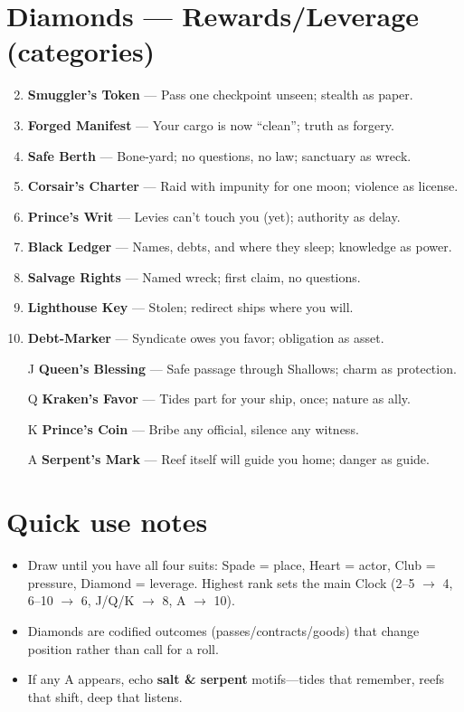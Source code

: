 \section*{Diamonds --- Rewards/Leverage (categories)}
\label{sec:zakov-rewards}
\begin{enumerate}
\setcounter{enumi}{1}
\item \textbf{Smuggler's Token} --- Pass one checkpoint unseen; stealth as paper.
\item \textbf{Forged Manifest} --- Your cargo is now ``clean''; truth as forgery.
\item \textbf{Safe Berth} --- Bone-yard; no questions, no law; sanctuary as wreck.
\item \textbf{Corsair's Charter} --- Raid with impunity for one moon; violence as license.
\item \textbf{Prince's Writ} --- Levies can't touch you (yet); authority as delay.
\item \textbf{Black Ledger} --- Names, debts, and where they sleep; knowledge as power.
\item \textbf{Salvage Rights} --- Named wreck; first claim, no questions.
\item \textbf{Lighthouse Key} --- Stolen; redirect ships where you will.
\item \textbf{Debt-Marker} --- Syndicate owes you favor; obligation as asset.
\item[J] \textbf{Queen's Blessing} --- Safe passage through Shallows; charm as protection.
\item[Q] \textbf{Kraken's Favor} --- Tides part for your ship, once; nature as ally.
\item[K] \textbf{Prince's Coin} --- Bribe any official, silence any witness.
\item[A] \textbf{Serpent's Mark} --- Reef itself will guide you home; danger as guide.
\end{enumerate}

\section*{Quick use notes}
\label{sec:zakov-quick-use}
\begin{itemize}
\item Draw until you have all four suits: Spade = place, Heart = actor, Club = pressure, Diamond = leverage. Highest rank sets the main Clock (2--5 $\rightarrow$ 4, 6--10 $\rightarrow$ 6, J/Q/K $\rightarrow$ 8, A $\rightarrow$ 10).
\item Diamonds are codified outcomes (passes/contracts/goods) that change position rather than call for a roll.
\item If any A appears, echo \textbf{salt \& serpent} motifs---tides that remember, reefs that shift, deep that listens.
\end{itemize}

